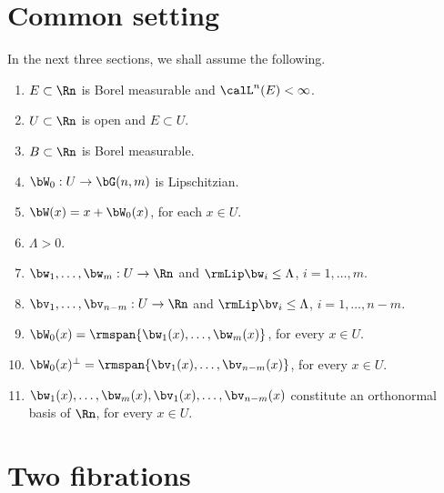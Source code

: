 \section{Common setting}

\begin{Empty}
\label{31}
In the next three sections, we shall assume the following.
\begin{enumerate}
\item $E \subset \Rn$ is Borel measurable and $\calL^n(E) < \infty$.
\item $U \subset \Rn$ is open and $E \subset U$.
\item $B \subset \Rn$ is Borel measurable.
\item $\bW_0: U \to \bG(n,m)$ is Lipschitzian.
\item $\bW(x) = x + \bW_0(x)$, for each $x \in U$.
\item $\Lambda > 0$.
\item $\bw_1,\ldots,\bw_m: U \to \Rn$ and $\rmLip \bw_i \leq \Lambda$, $i=1,\ldots,m$.
\item $\bv_1,\ldots,\bv_{n-m}: U \to \Rn$ and $\rmLip \bv_i \leq \Lambda$, $i=1,\ldots,n-m$.
\item $\bW_0(x) = \rmspan \{ \bw_1(x),\ldots,\bw_m(x)\}$, for every $x \in U$.
\item $\bW_0(x)^\perp = \rmspan \{ \bv_1(x),\ldots,\bv_{n-m}(x)\}$, for every $x \in U$.
\item $\bw_1(x),\ldots,\bw_m(x),\bv_1(x),\ldots,\bv_{n-m}(x)$ constitute an orthonormal basis of $\Rn$, for every $x \in U$.
\end{enumerate}
\end{Empty}

\section{Two fibrations}

